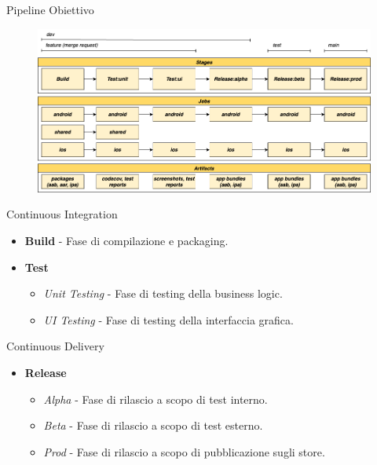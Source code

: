     \begin{frame}{Pipeline Obiettivo}
        \begin{figure}[H]
            \centering
            \includegraphics[width=1\textwidth]{img/tesi-2-Page-12.drawio.png}
        \end{figure}  
    \end{frame}

    \begin{frame}{Continuous Integration}
        \begin{itemize}
            \item \textbf{Build} - Fase di compilazione e packaging.
            \item \textbf{Test}
            \begin{itemize}
                \item \textit{Unit Testing} - Fase di testing della business logic.
                \item \textit{UI Testing} - Fase di testing della interfaccia grafica.
            \end{itemize}
        \end{itemize}
    \end{frame}

    \begin{frame}{Continuous Delivery}
        \begin{itemize}
            \item \textbf{Release}
            \begin{itemize}
                \item \textit{Alpha} - Fase di rilascio a scopo di test interno.
                \item \textit{Beta} - Fase di rilascio a scopo di test esterno.
                \item \textit{Prod} - Fase di rilascio a scopo di pubblicazione sugli store.
            \end{itemize}
        \end{itemize}
    \end{frame}


